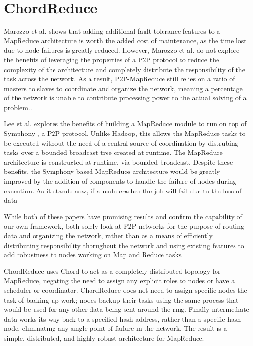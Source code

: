 \documentclass[10pt, conference, compsocconf]{IEEEtran}
\begin{document}
\section{ChordReduce}

Marozzo et al. \cite{marozzo2012p2p} shows that adding additional fault-tolerance features to a MapReduce architecture is worth the added cost of maintenance, as the time lost due to node failures is greatly reduced.  However, Marozzo et al. do not explore the benefits of leveraging the properties of a P2P protocol to reduce the complexity of the architecture and completely distribute the responsibility of the task across the network.  As a result, P2P-MapReduce still relies on a ratio of masters to slaves to coordinate and organize the network, meaning a percentage of the network is unable to contribute processing power to the actual solving of a problem..    

Lee et al. \cite{leemap} explores the benefits of building a MapReduce module to run on top of Symphony \cite{symphony},  a P2P protocol.  Unlike Hadoop, this allows the MapReduce tasks to be executed without the need of a central source of coordination by distrubing tasks over a bounded broadcast tree created at runtime.  The MapReduce architecture is constructed at runtime, via bounded broadcast. Despite these benefits, the Symphony based MapReduce architecture would be greatly improved by the addition of components to handle the failure of nodes during execution.  As it stands now, if a node crashes the job will fail due to the loss of data.

While both of these papers have promising results and confirm the capability of our own framework, both solely look at P2P networks for the purpose of routing data and organizing the network, rather than as a means of efficiently distributing responsibility thorughout the network and using existing features to add robustness to nodes working on Map and Reduce tasks.  

ChordReduce uses Chord to act as a completely distributed topology for MapReduce, negating the need to assign any explicit roles to nodes or have a scheduler or coordinator.  ChordReduce does not need to assign specific nodes the task of backing up work; nodes backup their tasks using the same process that would be used for any other data being sent around the ring.  Finally intermediate data works its way back to a specified hash address, rather than a specific hash node, eliminating any single point of failure in the network.  The result is a simple, distributed, and highly robust architecture for MapReduce.
\end{document}
